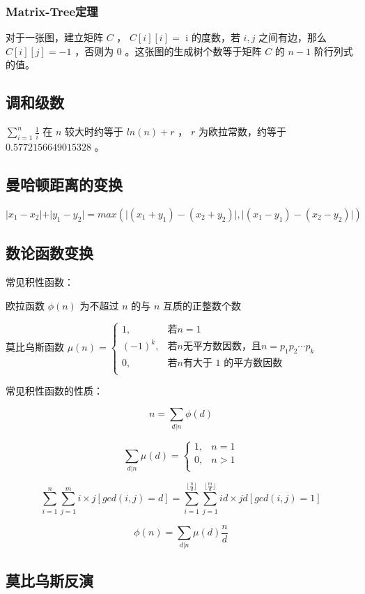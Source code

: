 \documentclass{article}
\begin{document}
\subsubsection{Matrix-Tree定理}
对于一张图，建立矩阵 $C$ ， $C[i][i] = $ i 的度数，若 $i, j$ 之间有边，那么 $C[i][j] = -1$ ，否则为 $0$ 。这张图的生成树个数等于矩阵 $C$ 的 $n-1$ 阶行列式的值。
\subsection{调和级数}
$\sum\limits_{i=1}^n \frac{1}{i}$ 在 $n$ 较大时约等于 $ln(n) + r$ ， $r$ 为欧拉常数，约等于 $0.5772156649015328$ 。
\subsection{曼哈顿距离的变换}
$\vert x_1 - x_2 \vert + \vert y_1 - y_2 \vert = max(\vert(x_1 + y_1) - (x_2 + y_2) \vert, \vert(x_1 - y_1) - (x_2 - y_2) \vert)$
\subsection{数论函数变换}

常见积性函数：

欧拉函数 $\phi(n)$ 为不超过 $n$ 的与 $n$ 互质的正整数个数

莫比乌斯函数 $\mu (n) = \left\{
	\begin{array}{lr}
	1, & \text{若} n = 1 \\
	(-1)^k, & \text{若} n \text{无平方数因数，且} n = p_1p_2 \cdots p_k \\
	0, & \text{若} n \text{有大于 1 的平方数因数} \\
	\end{array}
\right.
$

常见积性函数的性质：

$$n = \sum\limits_{d|n} \phi(d)$$

$$\sum\limits_{d|n} \mu(d) = \left\{
	\begin{array}{lr}
	1, & n = 1 \\
	0, & n > 1 \\
	\end{array}
\right.
$$

$$\sum\limits_{i=1}^{n} \sum\limits_{j=1}^{m} i \times j [gcd(i, j) = d] = \sum\limits_{i=1}^{\lfloor \frac{n}{d} \rfloor} \sum\limits_{j=1}^{\lfloor \frac{m}{d} \rfloor} id \times jd [gcd(i, j) = 1]$$

$$\phi(n) = \sum\limits_{d|n} \mu(d) \frac{n}{d}$$

\subsection{莫比乌斯反演}
\end{document}
